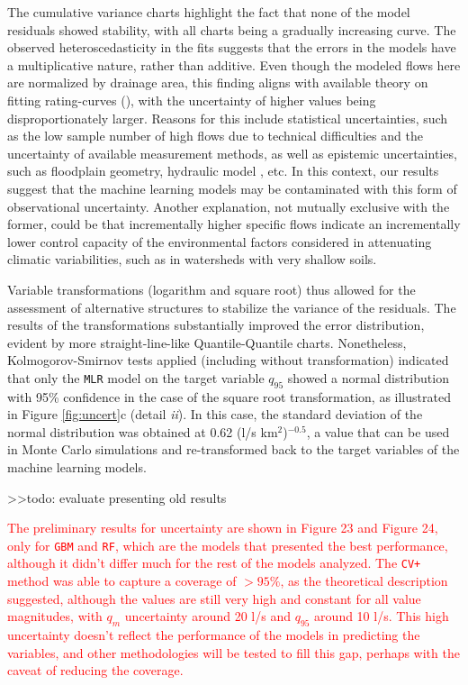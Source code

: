 \documentclass[12pt]{article}
\begin{document}
\par The cumulative variance charts highlight the fact that none of the model residuals showed stability, with all charts being a gradually increasing curve. The observed heteroscedasticity in the fits suggests that the errors in the models have a multiplicative nature, rather than additive. Even though the modeled flows here are normalized by drainage area, this finding aligns with available theory on fitting rating-curves (\cite{Mcmillan2015}), with the uncertainty of higher values being disproportionately larger. Reasons for this include statistical uncertainties, such as the low sample number of high flows due to technical difficulties and the uncertainty of available measurement methods, as well as epistemic uncertainties, such as floodplain geometry, hydraulic model , etc. In this context, our results suggest that the machine learning models may be contaminated with this form of observational uncertainty. Another explanation, not mutually exclusive with the former, could be that incrementally higher specific flows indicate an incrementally lower control capacity of the environmental factors considered in attenuating climatic variabilities, such as in watersheds with very shallow soils.

\par Variable transformations (logarithm and square root) thus allowed for the assessment of alternative structures to stabilize the variance of the residuals. The results of the transformations substantially improved the error distribution, evident by more straight-line-like Quantile-Quantile charts. Nonetheless, Kolmogorov-Smirnov tests applied (including without transformation) indicated that only the \texttt{MLR} model on the target variable $q_{95}$ showed a normal distribution with 95\% confidence in the case of the square root transformation, as illustrated in Figure \ref{fig:uncert}c (detail \textit{ii}). In this case, the standard deviation of the normal distribution was obtained at 0.62 (l/s km$^2$)$^{-0.5}$, a value that can be used in Monte Carlo simulations and re-transformed back to the target variables of the machine learning models.

\par >>todo: evaluate presenting old results

\par \textcolor{red}{The preliminary results for uncertainty are shown in Figure 23 and Figure 24, only for \texttt{GBM} and \texttt{RF}, which are the models that presented the best performance, although it didn’t differ much for the rest of the models analyzed. The \texttt{CV+} method was able to capture a coverage of $>95\%$, as the theoretical description suggested, although the values are still very high and constant for all value magnitudes, with $q_{m}$ uncertainty around 20 l/s and $q_{95}$ around 10 l/s. This high uncertainty doesn’t reflect the performance of the models in predicting the variables, and other methodologies will be tested to fill this gap, perhaps with the caveat of reducing the coverage.}
\end{document}
